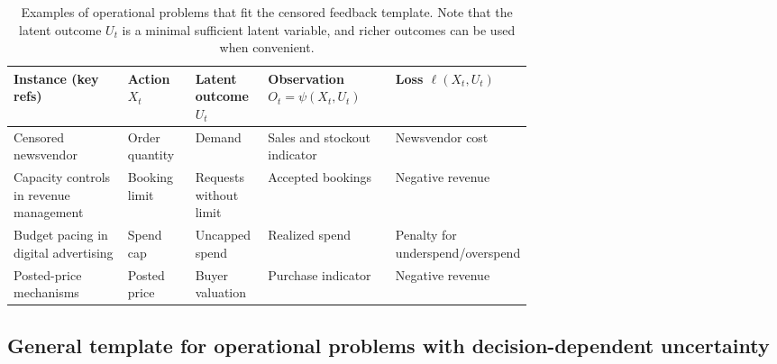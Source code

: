 \documentclass[11pt]{article}
\renewcommand{\arraystretch}{1.15}
\renewcommand{\arraystretch}{0.88}
\begin{document}
\begin{table}[t]
\caption{Examples of operational problems that fit the censored feedback template. Note that the latent outcome $U_t$ is a minimal sufficient latent variable, and richer outcomes can be used when convenient.}
\label{tab:app_examples}
\centering
\footnotesize
\setlength{\tabcolsep}{4pt}
\renewcommand{\arraystretch}{1.15}

\begin{tabularx}{\linewidth}{@{}
  >{\raggedright\arraybackslash}p{0.22\linewidth}
  >{\raggedright\arraybackslash}p{0.13\linewidth}
  >{\raggedright\arraybackslash}p{0.14\linewidth}
  >{\raggedright\arraybackslash}X
  >{\raggedright\arraybackslash}p{0.18\linewidth}
@{}}
\toprule
\textbf{Instance (key refs)} &
\textbf{Action $X_t$} &
\textbf{Latent outcome $U_t$} &
\textbf{Observation $O_t=\psi(X_t,U_t)$} &
\textbf{Loss $\ell(X_t,U_t)$} \\
\midrule

Censored newsvendor \cite{huh2011adaptive,besbes2022tradeoff} &
Order quantity &
Demand &
Sales and stockout indicator &
Newsvendor cost \\

\addlinespace
Capacity controls in revenue management \cite{TalluriVanRyzin2004,littlewood2005forecasting} &
Booking limit &
Requests without limit &
Accepted bookings &
Negative revenue \\

\addlinespace
Budget pacing in digital advertising \cite{BalseiroEtAl2023RobustPacing,ConitzerEtAl2022PacingEq} &
Spend cap &
Uncapped spend &
Realized spend &
Penalty for underspend/overspend \\

\addlinespace
Posted-price mechanisms \cite{KleinbergLeighton2003,Myerson1981} &
Posted price &
Buyer valuation &
Purchase indicator &
Negative revenue \\

\bottomrule
\end{tabularx}
\end{table}


\subsection{General template for operational problems with decision-dependent uncertainty}
\label{app:general_template}
\end{document}
